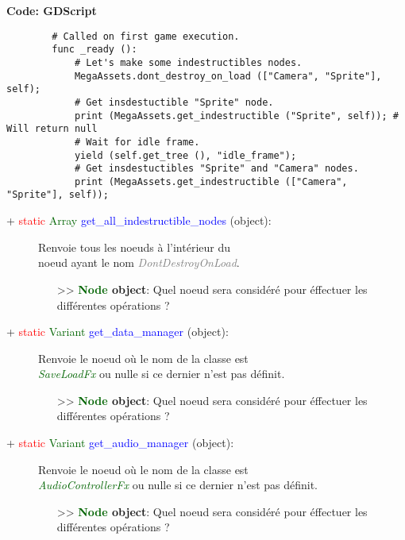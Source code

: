 \documentclass[a4paper, 11pt]{article}
\begin{document}
	\textbf{Code: GDScript}
	\begin{lstlisting}
		# Called on first game execution.
		func _ready ():
			# Let's make some indestructibles nodes.
			MegaAssets.dont_destroy_on_load (["Camera", "Sprite"], self);
			# Get insdestuctible "Sprite" node.
			print (MegaAssets.get_indestructible ("Sprite", self)); # Will return null
			# Wait for idle frame.
			yield (self.get_tree (), "idle_frame");
			# Get insdestuctibles "Sprite" and "Camera" nodes.
			print (MegaAssets.get_indestructible (["Camera", "Sprite"], self));
	\end{lstlisting}
	\begin{description}
		\item [+ \textcolor{red}{static} \textcolor{darkgreen}{Array} \textcolor{blue}
		{get\_all\_indestructible\_nodes} (object):] Renvoie tous les noeuds à l'intérieur du \\noeud ayant 
		le nom \textit{\textcolor{gray}{DontDestroyOnLoad}}.
		\begin{itemize}
			\item [>> \textbf{\textcolor{darkgreen}{Node} object}:] Quel noeud sera considéré pour éffectuer
			les différentes opérations ?\\
		\end{itemize}
	\end{description}
	\begin{description}
		\item [+ \textcolor{red}{static} \textcolor{darkgreen}{Variant} \textcolor{blue}{get\_data\_manager} 
		(object):] Renvoie le noeud où le nom de la classe est \textit{\textcolor{darkgreen}{\\SaveLoadFx}}
		ou nulle si ce dernier n'est pas définit.
		\begin{itemize}
			\item [>> \textbf{\textcolor{darkgreen}{Node} object}:] Quel noeud sera considéré pour éffectuer
			les différentes opérations ?\\
		\end{itemize}
	\end{description}
	\begin{description}
		\item [+ \textcolor{red}{static} \textcolor{darkgreen}{Variant} \textcolor{blue}
		{get\_audio\_manager} (object):] Renvoie le noeud où le nom de la classe est
		\textit{\textcolor{darkgreen}{\\AudioControllerFx}} ou nulle si ce dernier n'est pas définit.
		\begin{itemize}
			\item [>> \textbf{\textcolor{darkgreen}{Node} object}:] Quel noeud sera considéré pour éffectuer
			les différentes opérations ?\\
		\end{itemize}
	\end{description}
\end{document}
